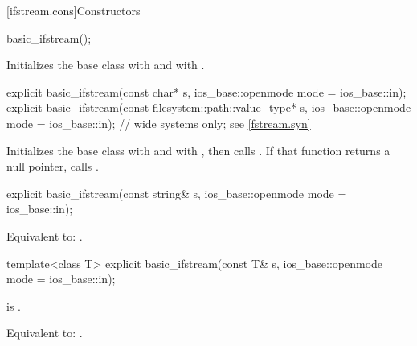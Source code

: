 [ifstream.cons]{Constructors}

%
\begin{itemdecl}
basic_ifstream();
\end{itemdecl}

\begin{itemdescr}
\pnum
\effects
Initializes the base class with
and  with
.
\end{itemdescr}

%
\begin{itemdecl}
explicit basic_ifstream(const char* s,
                        ios_base::openmode mode = ios_base::in);
explicit basic_ifstream(const filesystem::path::value_type* s,
                        ios_base::openmode mode = ios_base::in);  // wide systems only; see \ref{fstream.syn}
\end{itemdecl}

\begin{itemdescr}
\pnum
\effects
Initializes the base class with
and  with
,
then calls
.
If that function returns a null pointer, calls
.
\end{itemdescr}

%
\begin{itemdecl}
explicit basic_ifstream(const string& s,
                        ios_base::openmode mode = ios_base::in);
\end{itemdecl}

\begin{itemdescr}
\pnum
\effects
Equivalent to: .
\end{itemdescr}

%
\begin{itemdecl}
template<class T>
  explicit basic_ifstream(const T& s, ios_base::openmode mode = ios_base::in);
\end{itemdecl}

\begin{itemdescr}
\pnum
\constraints
{} is .

\pnum
\effects
Equivalent to: .
\end{itemdescr}

